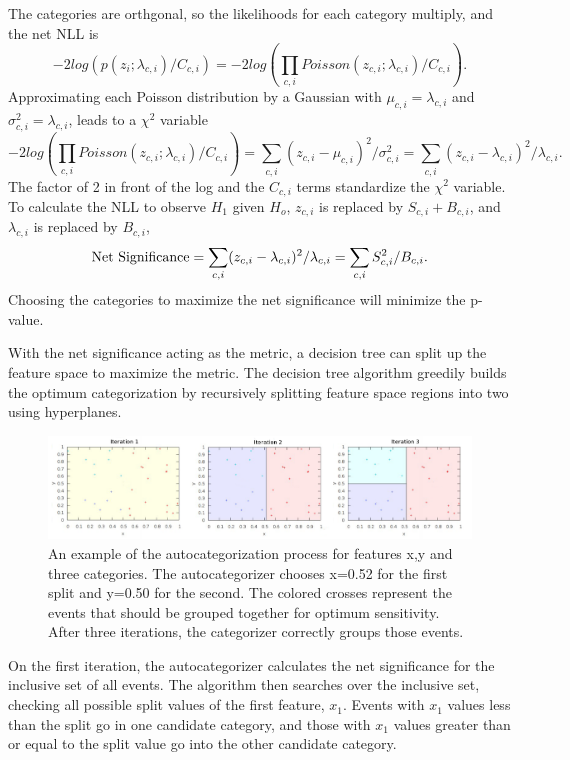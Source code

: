\documentclass[review]{elsarticle}
\begin{document}
The categories are orthgonal, so the likelihoods for each category multiply, and the net NLL is  
\begin{equation}
\label{second}
-2log\left( p(z_i; \lambda_{c,i})/C_{c,i} \right) = -2log \left( \prod_{c,i} Poisson(z_{c,i}; \lambda_{c,i})/C_{c,i} \right) .
\end{equation}
Approximating each Poisson distribution by a Gaussian with $\mu_{c,i}=\lambda_{c,i}$ and $\sigma_{c,i}^2 = \lambda_{c,i}$, leads to a $\chi^2$ variable
\begin{equation}
-2log\left( \prod_{c,i} Poisson(z_{c,i}; \lambda_{c,i})/C_{c,i} \right) = \sum_{c,i}(z_{c,i}-\mu_{c,i})^{2}/\sigma^2_{c,i} 
= \sum_{c,i}(z_{c,i}-\lambda_{c,i})^{2}/\lambda_{c,i}.
\end{equation}
The factor of 2 in front of the log and the $C_{c,i}$ terms standardize the $\chi^2$ variable. To calculate the NLL to observe $H_1$ given $H_o$, $z_{c,i}$ is replaced by $S_{c,i} + B_{c,i}$, and $\lambda_{c,i}$ is replaced by $B_{c,i}$, 
\begin{equation}
{\rm Net~Significance} = \sum_{c,i}(z_{c,i}-\lambda_{c,i})^{2}/\lambda_{c,i} = \sum_{c,i}S_{c,i}^{2}/B_{c,i}.
\end{equation}
Choosing the categories to maximize the net significance will minimize the p-value. 

With the net significance acting as the metric, a decision tree\cite{cart84} can split up the feature space to maximize the metric. The decision tree algorithm greedily builds the optimum categorization by recursively splitting feature space regions into two using hyperplanes. 
\begin{figure}[hbp]
  \centering
  \includegraphics[width=0.98\linewidth]{iter_all.png}
  \caption
  {An example of the autocategorization process for features x,y and three categories. The autocategorizer chooses x=0.52 for the first split and y=0.50 for the second. The colored crosses represent the events that should be grouped together for optimum sensitivity. After three iterations, the categorizer correctly groups those events.}
  \label{fig:iter_example}
\end{figure}
On the first iteration, the autocategorizer calculates the net significance for the inclusive set of all events. The algorithm then searches over the inclusive set, checking all possible split values of the first feature, $x_1$. Events with $x_1$ values less than the split go in one candidate category, and those with $x_1$ values greater than or equal to the split value go into the other candidate category. 
\end{document}
